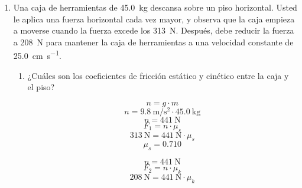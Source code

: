 \documentclass[Física - Práctica.root.tex]{subfiles}
\newcommand{\gravity}[1][per-mode=fraction]{\SI[#1]{9,8}{\meter\per\second\squared}}
\begin{document}
\begin{enumerate}
  \item Una caja de herramientas de \SI{45,0}{\kilogram} descansa sobre un piso horizontal. Usted le aplica
        una fuerza horizontal cada vez mayor, y observa que la caja empieza a moverse cuando la
        fuerza excede los \SI{313}{\newton}. Después, debe reducir la fuerza a \SI{208}{\newton} para mantener la caja de
        herramientas a una velocidad constante de \SI[per-mode=symbol]{25,0}{\centi\meter\per\second}.
        \begin{enumerate}
          \item ¿Cuáles son los coeficientes de fricción estático y cinético entre la caja y el piso?
                \begin{center}
                  \[ n = g\cdot m \]
                  \[ n = \gravity\cdot \SI{45,0}{\kilo\gram} \]
                  \[ n = \SI{441}{\newton} \]
                  \[ F_1 = n\cdot\mu_s \]
                  \[ \SI{313}{\newton} = \SI{441}{\newton}\cdot\mu_s \]
                  \[ \boxed{ \mu_s = \num{0,710} } \]
                  \[ n = \SI{441}{\newton} \]
                  \[ F_2 = n\cdot\mu_k \]
                  \[ \SI{208}{\newton} = \SI{441}{\newton}\cdot\mu_k \]

\end{center}
\end{enumerate}
\end{enumerate}
\end{document}
